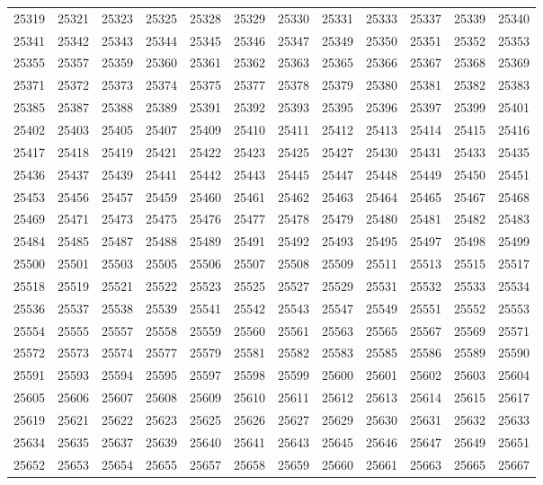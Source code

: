 \begin{center}
\begin{longtable}{llllllllllll}
25319 &25321 &25323 &25325 &25328 &25329 &25330 &25331 &25333 &25337 &25339 &25340 \\
25341 &25342 &25343 &25344 &25345 &25346 &25347 &25349 &25350 &25351 &25352 &25353 \\
25355 &25357 &25359 &25360 &25361 &25362 &25363 &25365 &25366 &25367 &25368 &25369 \\
25371 &25372 &25373 &25374 &25375 &25377 &25378 &25379 &25380 &25381 &25382 &25383 \\
25385 &25387 &25388 &25389 &25391 &25392 &25393 &25395 &25396 &25397 &25399 &25401 \\
25402 &25403 &25405 &25407 &25409 &25410 &25411 &25412 &25413 &25414 &25415 &25416 \\
25417 &25418 &25419 &25421 &25422 &25423 &25425 &25427 &25430 &25431 &25433 &25435 \\
25436 &25437 &25439 &25441 &25442 &25443 &25445 &25447 &25448 &25449 &25450 &25451 \\
25453 &25456 &25457 &25459 &25460 &25461 &25462 &25463 &25464 &25465 &25467 &25468 \\
25469 &25471 &25473 &25475 &25476 &25477 &25478 &25479 &25480 &25481 &25482 &25483 \\
25484 &25485 &25487 &25488 &25489 &25491 &25492 &25493 &25495 &25497 &25498 &25499 \\
25500 &25501 &25503 &25505 &25506 &25507 &25508 &25509 &25511 &25513 &25515 &25517 \\
25518 &25519 &25521 &25522 &25523 &25525 &25527 &25529 &25531 &25532 &25533 &25534 \\
25536 &25537 &25538 &25539 &25541 &25542 &25543 &25547 &25549 &25551 &25552 &25553 \\
25554 &25555 &25557 &25558 &25559 &25560 &25561 &25563 &25565 &25567 &25569 &25571 \\
25572 &25573 &25574 &25577 &25579 &25581 &25582 &25583 &25585 &25586 &25589 &25590 \\
25591 &25593 &25594 &25595 &25597 &25598 &25599 &25600 &25601 &25602 &25603 &25604 \\
25605 &25606 &25607 &25608 &25609 &25610 &25611 &25612 &25613 &25614 &25615 &25617 \\
25619 &25621 &25622 &25623 &25625 &25626 &25627 &25629 &25630 &25631 &25632 &25633 \\
25634 &25635 &25637 &25639 &25640 &25641 &25643 &25645 &25646 &25647 &25649 &25651 \\
25652 &25653 &25654 &25655 &25657 &25658 &25659 &25660 &25661 &25663 &25665 &25667 \\

\end{longtable}
\end{center}
